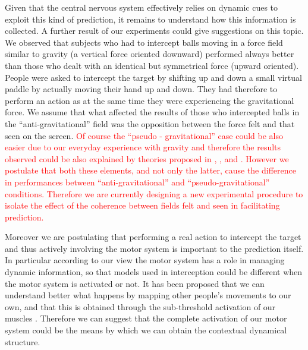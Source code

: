 Given that the central nervous system effectively relies on dynamic cues to exploit this kind of prediction, it remains to understand how this information is collected. A further result of our experiments could give suggestions on this topic.
We observed that subjects who had to intercept balls moving in a force field similar to gravity (a vertical force  oriented downward) performed always better than those who dealt with an identical but symmetrical force (upward oriented). People were asked to intercept the target by shifting up and down a small virtual paddle by actually moving their hand up and down. They had therefore to perform an action as at the same time they were experiencing the gravitational force. We assume that what affected the results of those who intercepted balls in the ``anti-gravitational'' field was the opposition between the force felt and that seen on the screen. 
\textcolor{red}{Of course the ``pseudo - gravitational'' case could be also easier due to our everyday experience with gravity and therefore the results observed could be also explained by theories proposed in \citep{McIntyre}, \citep{Lacquaniti}, \citep{Lacquaniti_internal} and \citep{McIntyre2}. However we postulate that both these elements, and not only the latter, cause the difference in performances between ``anti-gravitational'' and ``pseudo-gravitational''  conditions.
Therefore we are currently designing a new experimental procedure to isolate the effect of the coherence between fields felt and seen in facilitating prediction.}


Moreover we are postulating that performing a real action to intercept the target and thus actively involving the motor system is important to the prediction itself. In particular according to our view the motor system has a role in managing dynamic information, so that models used in interception could be different when the motor system is activated or not.
It has been proposed that we can understand better what happens by mapping other people's movements to our own, and that this is obtained through the sub-threshold activation of our muscles \citep{Wolpert_social}. Therefore we can suggest that the complete activation of our motor system could be the means by which we can obtain the contextual dynamical structure.

